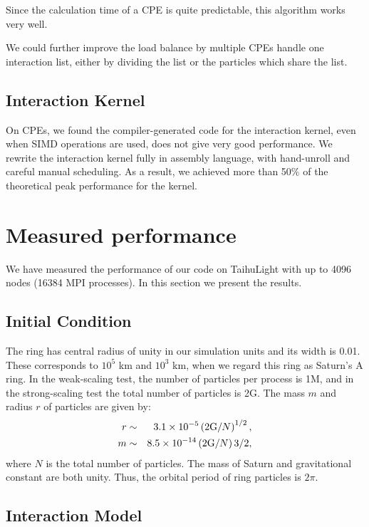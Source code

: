 \documentclass[oribibl]{llncs}
\begin{document}
Since the calculation time of a CPE is quite predictable, this
algorithm works very well.

We could further improve the load balance by multiple CPEs handle
one interaction list, either by dividing the list or the particles
which share the list.

\subsection{Interaction Kernel}

On CPEs, we found the compiler-generated code for the interaction
kernel, even when SIMD operations are used, does not give very good
performance. We rewrite the interaction kernel fully in assembly
language, with hand-unroll and careful manual scheduling. As a result,
we achieved more than 50\% of the theoretical peak performance for the
kernel.

\section{Measured performance}
\label{sec:result}

We have measured the performance of our code on TaihuLight with up to
4096 nodes (16384 MPI processes). In this section we present the
results.

\subsection{Initial Condition}

The ring has central radius of unity in our simulation units and its
width is 0.01. These corresponds to $10^5$ km and $10^3$ km, when we
regard this ring as Saturn's A ring.  In the weak-scaling test, the
number of particles per process is 1M, and in the strong-scaling test
the total number of particles is 2G. The mass $m$ and radius $r$ of
particles are given by:
\begin{eqnarray}
  r &\sim& 3.1 \times 10^{-5} \left( 2 {\rm G} / N \right)^{1/2}, \\ 
  m &\sim& 8.5 \times 10^{-14} \left( 2 {\rm G} / N \right){3/2}, 
\end{eqnarray}
where $N$ is the total number of particles. The mass of Saturn and
gravitational constant are both unity. Thus, the orbital period of
ring particles is $2\pi$.

\subsection{Interaction Model}
\end{document}
